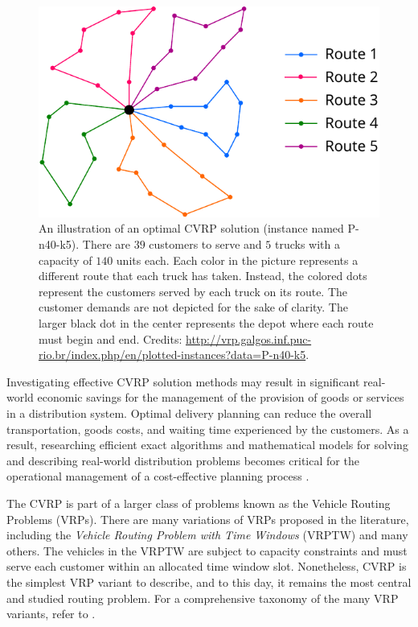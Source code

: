 \begin{figure}[t]
	\centering
	\includegraphics[width=12cm]{Imgs/P-n40-k5-solution.out.cropped.pdf}
	\caption{An illustration of an optimal CVRP solution (instance named P-n40-k5).
		There are $39$ customers to serve and $5$ trucks with a capacity of $140$ units each.
		Each color in the picture represents a different route that each truck has taken.
		Instead, the colored dots represent the customers served by each truck on its route.
		The customer demands are not depicted for the sake of clarity.
		The larger black dot in the center represents the depot where each route must begin and end.
		Credits: \url{http://vrp.galgos.inf.puc-rio.br/index.php/en/plotted-instances?data=P-n40-k5}.
	}
	\label{fig:cvrp-optimal-solution-example}
\end{figure}

Investigating effective CVRP solution methods may result in
significant real-world economic savings for the management
of the provision of goods or services in a distribution system.
Optimal delivery planning can reduce the overall transportation, goods costs,
and waiting time experienced by the customers.
As a result, researching efficient exact algorithms and mathematical models
for solving and describing real-world distribution problems
becomes critical for the operational management
of a cost-effective planning process \parencite{toth2002,toth2014}.

The CVRP is part of a larger class of problems known as the Vehicle Routing Problems (VRPs).
There are many variations of VRPs proposed in the literature, including
the \textit{Vehicle Routing Problem with Time Windows} (VRPTW) \parencite{schrage1981}
and many others.
The vehicles in the VRPTW are subject to capacity constraints
and must serve each customer within an allocated time window slot.
Nonetheless, CVRP is the simplest VRP variant to describe,
and to this day, it remains the most central and studied routing problem.
For a comprehensive taxonomy of the many VRP variants, refer to \textcite{eksioglu2009, braekers2016}.

